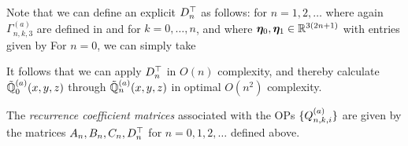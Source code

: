 Note that we can define an explicit $D^\top_n$ as follows:
for $n = 1, 2, \dots$ where again $\Gamma^{(a)}_{n,k,3}$ are defined in  and  for $k=0,\dots,n$, and where $\bm{\eta}_{0}, \bm{\eta}_{1} \in \mathbb{R}^{3(2n+1)}$ with entries given by 
For $n=0$, we can simply take

It follows that we can apply $D^\top_n$ in $O(n)$ complexity, and thereby calculate $\mathbb{\tilde{Q}}^{(a)}_{0}(x,y,z)$  through $\mathbb{\tilde{Q}}^{(a)}_{n}(x,y,z)$ in optimal $O(n^2)$ complexity. 

\begin{definition}\label{def:sc:clenshawmats}
	The \textit{recurrence coefficient matrices} associated with the OPs $\{Q_{n,k,i}^{(a)}\}$ are given by the matrices $A_n, B_n, C_n, D^\top_n$ for $n = 0,1,2,\dots$ defined above.
\end{definition}


